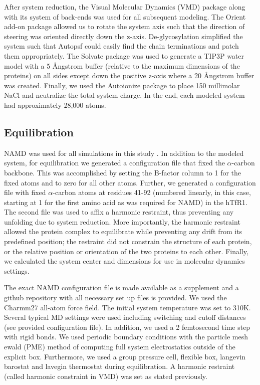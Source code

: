 \documentclass[12pt]{article}
\begin{document}
After system reduction, the Visual Molecular Dynamics (VMD) \citep{Humphrey1996} package along with its system of back-ends was used for all subsequent modeling. The Orient add-on package allowed us to rotate the system axis such that the direction of steering was oriented directly down the z-axis. De-glycosylation simplified the system such that Autopsf could easily find the chain terminations and patch them appropriately. The Solvate package was used to generate a TIP3P water model with a 5 \AA ngstrom buffer (relative to the maximum dimensions of the proteins) on all sides except down the positive z-axis where a 20 \AA ngstrom buffer was created. Finally, we used the Autoionize package to place 150 millimolar NaCl and neutralize the total system charge. In the end, each modeled system had approximately 28,000 atoms.

\subsection{Equilibration}

NAMD was used for all simulations in this study \citep{Phillips2005}. In addition to the modeled system, for equilibration we generated a configuration file that fixed the $\alpha$-carbon backbone. This was accomplished by setting the B-factor column to 1 for the fixed atoms and to zero for all other atoms. Further, we generated a configuration file with fixed $\alpha$-carbon atoms at residues 41-92 (numbered linearly, in this case, starting at 1 for the first amino acid as was required for NAMD) in the hTfR1. The second file was used to affix a harmonic restraint, thus preventing any unfolding due to system reduction. More importantly, the harmonic restraint allowed the protein complex to equilibrate while preventing any drift from its predefined position; the restraint did not constrain the structure of each protein, or the relative position or orientation of the two proteins to each other. Finally, we calculated the system center and dimensions for use in molecular dynamics settings.

The exact NAMD configuration file is made available as a supplement and a github repository with all necessary set up files is provided. We used the Charmm27 \citep{Brooks1983} all-atom force field. The initial system temperature was set to 310K. Several typical MD settings were used including switching and cutoff distances (see provided configuration file). In addition, we used a 2 femtosecond time step with rigid bonds. We used periodic boundary conditions with the particle mesh ewald (PME) method of computing full system electrostatics outside of the explicit box. Furthermore, we used a group pressure cell, flexible box, langevin barostat and lavegin thermostat during equilibration. A harmonic restraint (called harmonic constraint in VMD) was set as stated previously. 
\end{document}
